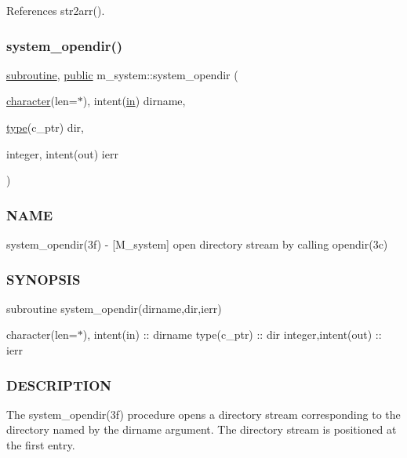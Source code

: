 References str2arr().

\mbox{\label{namespacem__system_a622cc67c03e8cdea1d4c2430bb36081b}} 
\subsubsection{\texorpdfstring{system\+\_\+opendir()}{system\_opendir()}}
{\footnotesize\ttfamily \hyperlink{M__stopwatch_83_8txt_acfbcff50169d691ff02d4a123ed70482}{subroutine}, \hyperlink{M__stopwatch_83_8txt_a2f74811300c361e53b430611a7d1769f}{public} m\+\_\+system\+::system\+\_\+opendir (\begin{DoxyParamCaption}\item[{\hyperlink{option__stopwatch_83_8txt_abd4b21fbbd175834027b5224bfe97e66}{character}(len=$\ast$), intent(\hyperlink{M__journal_83_8txt_afce72651d1eed785a2132bee863b2f38}{in})}]{dirname,  }\item[{\hyperlink{stop__watch_83_8txt_a70f0ead91c32e25323c03265aa302c1c}{type}(c\+\_\+ptr)}]{dir,  }\item[{integer, intent(out)}]{ierr }\end{DoxyParamCaption})}



\subsubsection*{N\+A\+ME}

system\+\_\+opendir(3f) -\/ \mbox{[}M\+\_\+system\mbox{]} open directory stream by calling opendir(3c) \subsubsection*{S\+Y\+N\+O\+P\+S\+IS}

subroutine system\+\_\+opendir(dirname,dir,ierr)

character(len=$\ast$), intent(in) \+:\+: dirname type(c\+\_\+ptr) \+:\+: dir integer,intent(out) \+:\+: ierr

\subsubsection*{D\+E\+S\+C\+R\+I\+P\+T\+I\+ON}

The system\+\_\+opendir(3f) procedure opens a directory stream corresponding to the directory named by the dirname argument. The directory stream is positioned at the first entry.

